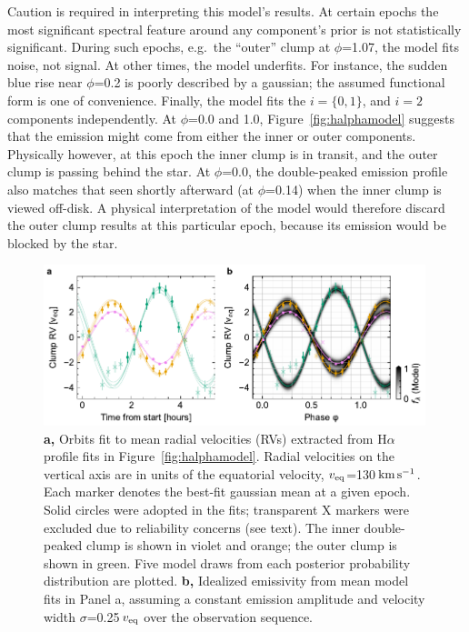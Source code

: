 \documentclass{nature3}
\newcommand{\kms}{\ensuremath{\rm km\,s^{-1}}}
\begin{document}
\begin{methods}
Caution is required in interpreting this model's results.  At certain
epochs the most significant spectral feature around any component's
prior is not statistically significant.  During such epochs, e.g.~the
``outer'' clump at $\phi$=1.07, the model fits noise, not signal.  At
other times, the model underfits.  For instance, the sudden blue rise
near $\phi$=0.2 is poorly described by a gaussian; the assumed
functional form is one of convenience.  Finally, the model fits the
$i=\{ 0, 1 \}$, and $i=2$ components independently.  At $\phi$=0.0 and
1.0, Figure~\ref{fig:halphamodel} suggests that the emission might
come from either the inner or outer components.  Physically however,
at this epoch the inner clump is in transit, and the outer clump is
passing behind the star.  At $\phi$=0.0, the double-peaked emission
profile also matches that seen shortly afterward (at $\phi$=0.14) when
the inner clump is viewed off-disk.  A physical interpretation of the
model would therefore discard the outer clump results at this
particular epoch, because its emission would be blocked by the star.

\begin{figure}[!t]
  \centering
  \includegraphics[width=0.99\textwidth]{figures/sf7.pdf}
  \caption{{\bf a,} Orbits fit to mean radial velocities (RVs)
  extracted from H$\alpha$ profile fits in
  Figure~\ref{fig:halphamodel}.  Radial velocities on the vertical
  axis are in units of the equatorial velocity, $v_{\rm
  eq}$=130\,\kms.  Each marker denotes the best-fit gaussian mean at a
  given epoch.  Solid circles were adopted in the fits; transparent X
  markers were excluded due to reliability concerns (see text).  The
  inner double-peaked clump is shown in violet and orange; the outer
  clump is shown in green.  Five model draws from each posterior
  probability distribution are plotted.  {\bf b,} Idealized emissivity
  from mean model fits in Panel a, assuming a constant emission
  amplitude and velocity width $\sigma$=0.25\,$v_{\rm eq}$ over the
  observation sequence.}
  \label{fig:orbits}
\end{figure}


\end{methods}
\end{document}

